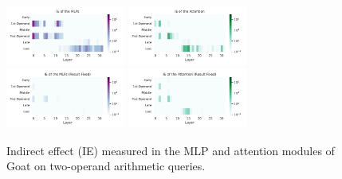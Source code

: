 \documentclass[11pt]{article}
\begin{document}
\begin{figure}[t]
    \centering
    \includegraphics[width=0.35\textwidth]{img/goat/goat-mlp.pdf}
    \includegraphics[width=0.35\textwidth]{img/goat/goat-attn.pdf}
    \includegraphics[width=0.35\textwidth]{img/goat/goat-mlp-int2.pdf}
    \includegraphics[width=0.35\textwidth]{img/goat/goat-attn-int2.pdf}
    \caption{Indirect effect (IE) measured in the MLP and attention modules of Goat on two-operand arithmetic queries.}
    \label{fig:goat}
\end{figure}
\end{document}
